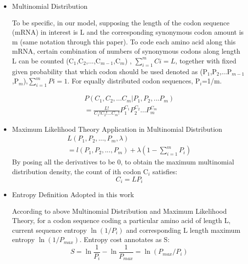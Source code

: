 \documentclass[conference]{IEEEtran}
\begin{document}
\begin{itemize}

\item{Multinomial Distribution}

To be specific, in our model, supposing the length of the codon sequence (mRNA) in interest is L and the corresponding synonymous codon amount is m (same notation through this paper). To code each amino acid along this mRNA, certain combination of numbers of synonymous codons along length L can be counted (C$_1$,C$_2$,...,C$_{m-1}$,C$_m$) , $\sum_{i=1}^{m}Ci= L$, together with fixed given probability that which codon should be used denoted as (P$_1$,P$_2$,...P$_{m-1}$,P$_m$),$\sum_{i=1}^{m} Pi= 1$. For equally distributed codon sequences, P$_i$=1/m.

\begin{equation} \label{Multinomial Probability Density}
\begin{split}
P(C_1,C_2,...C_m | P_1,P_2,...P_m) \\ =\frac{L!}{C_1!C_2!...C_m!}P_1^ {C_1}P_2^{C_2}...P_m^{C_m} 
\end{split}
\end{equation}

\item{Maximum Likelihood Theory Application in Multinomial Distribution}
\begin{equation} \label{Maximum likelihood}
\begin{split}
L(P_1, P_2, ..., P_m, \lambda) \\ = l(P_1, P_2, ..., P_m) + \lambda (1 - \sum_{i=1}^{m} P_i)
\end{split}
\end{equation}
By posing all the derivatives to be 0, to obtain the maximum multinomial distribution density, the count of ith codon C$_i$ satisfies:
\begin{equation} \label{occurrence for maximum probability}
C_i=LP_i
\end{equation}


\item {Entropy Definition Adopted in this work}

According to above Multinomial Distribution and Maximum Likelihood Theory, for a codon sequence coding a particular amino acid of length L, current sequence entropy $\ln (1/P_i)$ and corresponding L length maximum entropy $\ln (1/P_{max})$. Entropy cost annotates as S:
\begin{equation} \label{Entropy Cost}
S=\ln \frac{1}{P_i}-\ln \frac{1}{P_{max}}=\ln (P_{max}/P_i)
\end{equation}


\end{itemize}
\end{document}
